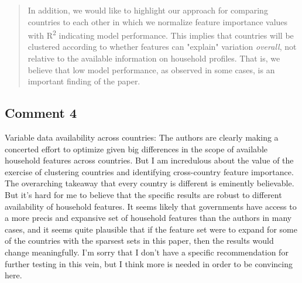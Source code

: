 \documentclass[11pt]{article}
\newenvironment{response}
{\begin{quote}\color{black}}
{\end{quote}}
\begin{document}
\begin{response}
    
\end{response}

\begin{revisionbox}
    
\end{revisionbox}

\begin{response}
    In addition, we would like to highlight our approach for comparing countries to each other in which we normalize feature importance values with R\textsuperscript{2} indicating model performance. This implies that countries will be clustered according to whether features can "explain" variation \textit{overall}, not relative to the available information on household profiles. That is, we believe that low model performance, as observed in some cases, is an important finding of the paper.
\end{response}

\subsection*{Comment 4}\label{comment_R1_4}

\begin{commentbox}
    Variable data availability across countries: The authors are clearly making a concerted effort to optimize given big differences in the scope of available household features across countries. But I am incredulous about the value of the exercise of clustering countries and identifying cross-country feature importance. The overarching takeaway that every country is different is eminently believable. But it's hard for me to believe that the specific results are robust to different availability of household features. It seems likely that governments have access to a more precis and expansive set of household features than the authors in many cases, and it seems quite plausible that if the feature set were to expand for some of the countries with the sparsest sets in this paper, then the results would change meaningfully. I'm sorry that I don't have a specific recommendation for further testing in this vein, but I think more is needed in order to be convincing here.
\end{commentbox}
\end{document}
